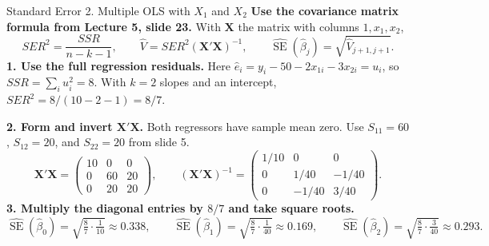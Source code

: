 \documentclass[10pt,aspectratio=169]{beamer}
\newcommand{\SE}{\operatorname{SE}}
\begin{document}
\begin{frame}{Standard Error 2. Multiple OLS with $X_1$ and $X_2$}
\small
\textbf{Use the covariance matrix formula from Lecture 5, slide 23.}
With $\mathbf X$ the matrix with columns $1,x_1,x_2$,
\[
SER^2=\frac{SSR}{n-k-1},\qquad
\widehat V=SER^2(\mathbf X'\mathbf X)^{-1},\qquad
\widehat{\SE}(\hat\beta_j)=\sqrt{\widehat V_{j+1,j+1}}.
\]
\textbf{1. Use the full regression residuals.}
Here $\hat e_i=y_i-50-2x_{1i}-3x_{2i}=u_i$, so $SSR=\sum_i u_i^2=8$. With $k=2$ slopes and an intercept, $SER^2=8/(10-2-1)=8/7$.
\medskip

\textbf{2. Form and invert $\mathbf X'\mathbf X$.}
Both regressors have sample mean zero. Use $S_{11}=60$, $S_{12}=20$, and $S_{22}=20$ from slide 5.
\[
\mathbf X'\mathbf X=
\begin{pmatrix}10&0&0\\0&60&20\\0&20&20\end{pmatrix},
\qquad
(\mathbf X'\mathbf X)^{-1}=
\begin{pmatrix}1/10&0&0\\0&1/40&-1/40\\0&-1/40&3/40\end{pmatrix}.
\]
\textbf{3. Multiply the diagonal entries by $8/7$ and take square roots.}
\[
\widehat{\SE}(\hat\beta_0)=\sqrt{\tfrac87\cdot\tfrac1{10}}\approx0.338,
\qquad
\boxed{\widehat{\SE}(\hat\beta_1)=\sqrt{\tfrac87\cdot\tfrac1{40}}\approx0.169,}
\qquad
\widehat{\SE}(\hat\beta_2)=\sqrt{\tfrac87\cdot\tfrac3{40}}\approx0.293.
\]
\end{frame}
\end{document}
